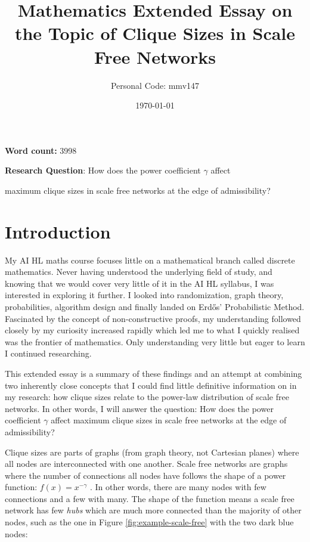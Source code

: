 \documentclass[12pt, a4paper]{article}   %
\title{Mathematics Extended Essay on the Topic of Clique Sizes in Scale Free Networks}
\author{Personal Code: mmv147}
\date{\today}
\begin{document}
\maketitle
\begin{center}
    \textbf{Word count:} 3998
    \par
    \bigskip
    \bigskip
    \textbf{Research Question}: How does the power coefficient \( \gamma \) affect \par maximum clique sizes in scale free networks at the edge of admissibility?
\end{center}

\newpage
\tableofcontents
\newpage

\section{Introduction}

My AI HL maths course focuses little on a mathematical branch called discrete mathematics. Never having understood the underlying field of study, and knowing that we would cover very little of it in the AI HL syllabus, I was interested in exploring it further. I looked into randomization, graph theory, probabilities, algorithm design and finally landed on Erdős’ Probabilistic Method. Fascinated by the concept of non-constructive proofs, my understanding followed closely by my curiosity increased rapidly which led me to what I quickly realised was the frontier of mathematics. Only understanding very little but eager to learn I continued researching. 

This extended essay is a summary of these findings and an attempt at combining two inherently close concepts that I could find little definitive information on in my research: how clique sizes relate to the power-law distribution of scale free networks. In other words, I will answer the question: How does the power coefficient \( \gamma \) affect maximum clique sizes in scale free networks at the edge of admissibility?

Clique sizes are parts of graphs (from graph theory, not Cartesian planes) where all nodes are interconnected with one another. Scale free networks are graphs where the number of connections all nodes have follows the shape of a power function: \(f(x)=x^{-\gamma}\) \textcite{ScalefreeNetwork2026}. In other words, there are many nodes with few connections and a few with many. The shape of the function means a scale free network has few \textit{hubs} which are much more connected than the majority of other nodes, such as the one in Figure \ref{fig:example-scale-free} with the two dark blue nodes:
\end{document}
